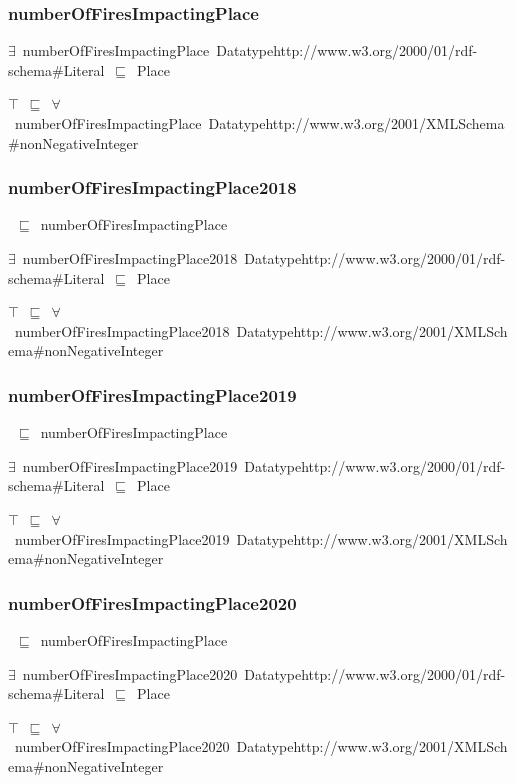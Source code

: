 \documentclass{article}
\begin{document}
\subsubsection*{numberOfFiresImpactingPlace}

\ensuremath{\exists}~numberOfFiresImpactingPlace~Datatypehttp://www.w3.org/2000/01/rdf-schema#Literal~\ensuremath{\sqsubseteq}~Place

\ensuremath{\top}~\ensuremath{\sqsubseteq}~\ensuremath{\forall}~numberOfFiresImpactingPlace~Datatypehttp://www.w3.org/2001/XMLSchema#nonNegativeInteger

\subsubsection*{numberOfFiresImpactingPlace2018}

~\ensuremath{\sqsubseteq}~numberOfFiresImpactingPlace

\ensuremath{\exists}~numberOfFiresImpactingPlace2018~Datatypehttp://www.w3.org/2000/01/rdf-schema#Literal~\ensuremath{\sqsubseteq}~Place

\ensuremath{\top}~\ensuremath{\sqsubseteq}~\ensuremath{\forall}~numberOfFiresImpactingPlace2018~Datatypehttp://www.w3.org/2001/XMLSchema#nonNegativeInteger

\subsubsection*{numberOfFiresImpactingPlace2019}

~\ensuremath{\sqsubseteq}~numberOfFiresImpactingPlace

\ensuremath{\exists}~numberOfFiresImpactingPlace2019~Datatypehttp://www.w3.org/2000/01/rdf-schema#Literal~\ensuremath{\sqsubseteq}~Place

\ensuremath{\top}~\ensuremath{\sqsubseteq}~\ensuremath{\forall}~numberOfFiresImpactingPlace2019~Datatypehttp://www.w3.org/2001/XMLSchema#nonNegativeInteger

\subsubsection*{numberOfFiresImpactingPlace2020}

~\ensuremath{\sqsubseteq}~numberOfFiresImpactingPlace

\ensuremath{\exists}~numberOfFiresImpactingPlace2020~Datatypehttp://www.w3.org/2000/01/rdf-schema#Literal~\ensuremath{\sqsubseteq}~Place

\ensuremath{\top}~\ensuremath{\sqsubseteq}~\ensuremath{\forall}~numberOfFiresImpactingPlace2020~Datatypehttp://www.w3.org/2001/XMLSchema#nonNegativeInteger
\end{document}

